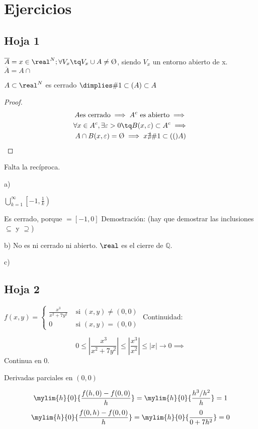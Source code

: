 \section{Ejercicios}
\subsection{Hoja 1}

\begin{problem}[?]
\solution
$\overline{A} = { x \in \real^N; \forall V_x \tq V_x \cup A \neq \text{\O}}$, siendo $V_x$ un entorno abierto de x.
	$\overline{A} = A \cap $ 
	
\begin{theorem}
$A \subset \real^N$ es cerrado $\dimplies \acum{A}\subset A$ 
\end{theorem}

 
\end{problem}
\begin{proof}
\begin{gather*}
A \text{es cerrado} \implies A^c \text{ es abierto} \implies\\
\forall x \in A^c, \exists \varepsilon > 0 \tq B(x,\varepsilon) \subset A^c \implies\\
A \cap B(x,\varepsilon) = \text{\O} \implies x \nexists \acum(A) 
\end{gather*}
\end{proof}
Falta la recíproca.


\begin{problem}[3] 
\solution
a)

$\displaystyle\bigcup_{k=1}^{\infty} \left[-1,\frac{1}{k}\right)$

Es cerrado, porque $=[-1,0]$
Demostración: (hay que demostrar las inclusiones $\subseteq$ y $\supseteq$)

b)
No es ni cerrado ni abierto.
\obs $\real$ es el cierre de $\mathbb{Q}$.

c)
 
\end{problem}

\newpage
\subsection{Hoja 2}

\begin{problem}[?]
\solution
$f(x,y) = \left\{\begin{matrix}
                \displaystyle \frac{x^3}{x^2+7y^2} & \text{ si } (x,y) \neq (0,0)\\
                 0 & \text{ si } (x,y) = (0,0)
                \end{matrix}\right.$
Continuidad:

$$0\leq \left| \frac{x^3}{x^2+7y^2} \right| \leq \left| \frac{x^3}{x^2} \right| \leq |x| \rightarrow 0 \implies$$ Continua en 0.

Derivadas parciales en $(0,0)$

$$\mylim{h}{0} {\frac{f(h,0) - f(0,0)}{h}} = \mylim{h}{0} {\displaystyle\frac{{h^{3}}/{h^{2}}}{h}} = 1$$
$$\mylim{h}{0} {\frac{f(0,h) - f(0,0)}{h}} = \mylim{h}{0} {\frac{0}{0+7h^2}} = 0$$
\end{problem}
 
